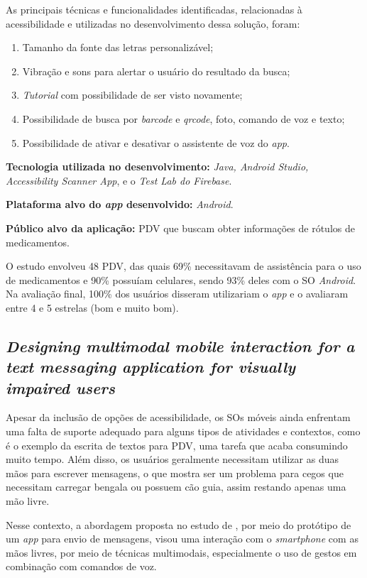 As principais técnicas e funcionalidades identificadas, relacionadas à acessibilidade e utilizadas no desenvolvimento dessa solução, foram:

\begin{enumerate}
    \item Tamanho da fonte das letras personalizável;
    \item Vibração e sons para alertar o usuário do resultado da busca;
    \item \emph{Tutorial} com possibilidade de ser visto novamente;
    \item Possibilidade de busca por \emph{barcode} e \emph{qrcode}, foto, comando de voz e texto;
    \item Possibilidade de ativar e desativar o assistente de voz do \emph{app}.
\end{enumerate}

\textbf{Tecnologia utilizada no desenvolvimento:} \emph{Java, Android Studio, Accessibility Scanner App}, e o \emph{Test Lab do Firebase}.

\textbf{Plataforma alvo do \emph{app} desenvolvido:} \emph{Android}.

\textbf{Público alvo da aplicação:} PDV que buscam obter informações de rótulos de medicamentos\@.

O estudo envolveu 48 PDV, das quais 69\% necessitavam de assistência para o uso de medicamentos e 90\% possuíam celulares, sendo 93\%  deles com o SO \emph{Android}.
Na avaliação final, 100\% dos usuários disseram utilizariam o \emph{app} e o avaliaram entre 4 e 5 estrelas (bom e muito bom).


\subsection{\emph{Designing multimodal mobile interaction for a text messaging application for visually impaired users}}

Apesar da inclusão de opções de acessibilidade, os SOs móveis ainda enfrentam uma falta de suporte adequado para alguns tipos de atividades e contextos, como é o exemplo da escrita de textos para PDV, uma tarefa que acaba consumindo muito tempo.
Além disso, os usuários geralmente necessitam utilizar as duas mãos para escrever mensagens, o que mostra ser um problema para cegos que necessitam carregar bengala ou possuem cão guia, assim restando apenas uma mão livre.

Nesse contexto, a abordagem proposta no estudo de , por meio do protótipo de um \emph{app} para envio de mensagens, visou uma interação com o \emph{smartphone}
com as mãos livres, por meio de técnicas multimodais, especialmente o uso de gestos em combinação com comandos de voz.

